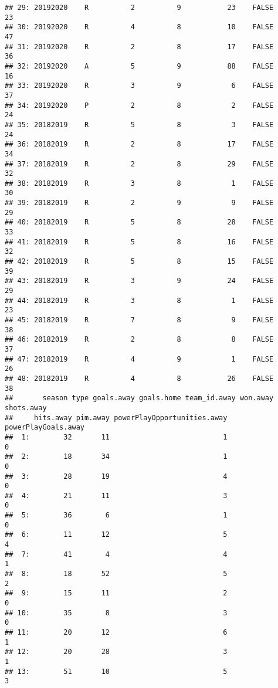 \documentclass[
]{article}
\begin{document}
\begin{verbatim}
## 29: 20192020    R          2          9           23    FALSE         23
## 30: 20192020    R          4          8           10    FALSE         47
## 31: 20192020    R          2          8           17    FALSE         36
## 32: 20192020    A          5          9           88    FALSE         16
## 33: 20192020    R          3          9            6    FALSE         37
## 34: 20192020    P          2          8            2    FALSE         24
## 35: 20182019    R          5          8            3    FALSE         24
## 36: 20182019    R          2          8           17    FALSE         34
## 37: 20182019    R          2          8           29    FALSE         32
## 38: 20182019    R          3          8            1    FALSE         30
## 39: 20182019    R          2          9            9    FALSE         29
## 40: 20182019    R          5          8           28    FALSE         33
## 41: 20182019    R          5          8           16    FALSE         32
## 42: 20182019    R          5          8           15    FALSE         39
## 43: 20182019    R          3          9           24    FALSE         29
## 44: 20182019    R          3          8            1    FALSE         23
## 45: 20182019    R          7          8            9    FALSE         38
## 46: 20182019    R          2          8            8    FALSE         37
## 47: 20182019    R          4          9            1    FALSE         26
## 48: 20182019    R          4          8           26    FALSE         38
##       season type goals.away goals.home team_id.away won.away shots.away
##     hits.away pim.away powerPlayOpportunities.away powerPlayGoals.away
##  1:        32       11                           1                   0
##  2:        18       34                           1                   0
##  3:        28       19                           4                   0
##  4:        21       11                           3                   0
##  5:        36        6                           1                   0
##  6:        11       12                           5                   4
##  7:        41        4                           4                   1
##  8:        18       52                           5                   2
##  9:        15       11                           2                   0
## 10:        35        8                           3                   0
## 11:        20       12                           6                   1
## 12:        20       28                           3                   1
## 13:        51       10                           5                   3

\end{verbatim}
\end{document}
